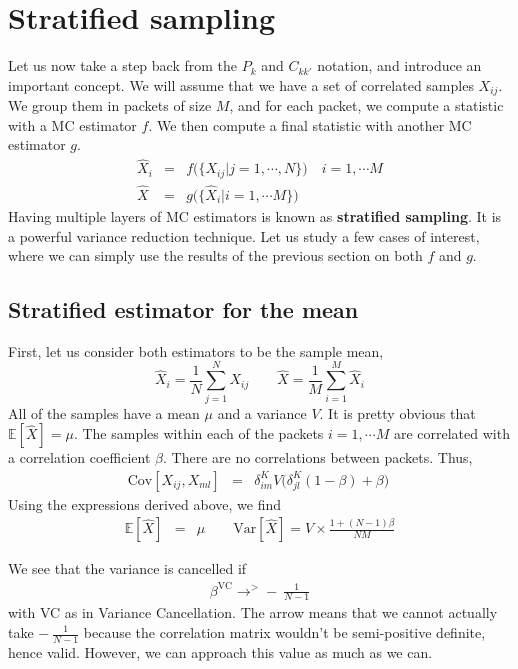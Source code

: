 \documentclass{aastex6}
\newcommand{\equ}[1]{\begin{equation}#1\end{equation}}
\newcommand{\eqn}[1]{\begin{eqnarray}#1\end{eqnarray}}
\begin{document}
\section{Stratified sampling}

Let us now take a step back from the $P_k$ and $C_{kk'}$ notation, and introduce an important concept. 
We will assume that we have a set of correlated samples $X_{ij}$. 
We group them in packets of size $M$, and for each packet, we compute a statistic with a MC estimator $f$. 
We then compute a final statistic with another MC estimator $g$. 
\eqn{
	\hat{X}_i &=& f\bigl(\{X_{ij} | j=1, \cdots, N\}\bigr) \quad i=1, \cdots M \\
	\hat{X} &=& g\bigl(\{\hat{X}_i | i=1, \cdots M\}\bigr)
}
Having multiple layers of MC estimators is known as \textbf{stratified sampling}. It is a powerful variance reduction technique.
Let us study a few cases of interest, where we can simply use the results of the previous section on both $f$ and $g$.

\subsection{Stratified estimator for the mean}

First, let us consider both estimators to be the sample mean,
\equ{
	\hat{X}_i = \frac{1}{N}\sum_{j=1}^N X_{ij}  \quad\quad \hat{X} =  \frac{1}{M}\sum_{i=1}^M \hat{X}_i 
	}
All of the samples have a mean $\mu$ and a variance $V$. It is pretty obvious that $\mathbb{E}[\hat{X}] = \mu$.
The samples within each of the packets $i=1, \cdots M$ are correlated with a correlation coefficient $\beta$. 
There are no correlations between packets. Thus,
\eqn{
	\mathrm{Cov}[X_{ij}, X_{ml}] &=& \delta^K_{im} V \bigl(\delta^K_{jl}(1-\beta) + \beta\bigr) \ 
}
Using the expressions derived above, we find
\eqn{
	\mathbb{E}[\hat{X}] &=& \mu\quad\quad
	\mathrm{Var}[\hat{X}] =  V \times \frac{1 + (N-1)\beta}{N M}
}

We see that the variance is cancelled if 
\eqn{
	\beta^\mathrm{VC} \rightarrow^{>} - \ \frac{1}{N-1}
}
with VC as in Variance Cancellation. The arrow means that we cannot actually take $- \ \frac{1}{N-1}$ because the correlation matrix wouldn't be semi-positive definite, hence valid. However, we can approach this value as much as we can.
\end{document}
